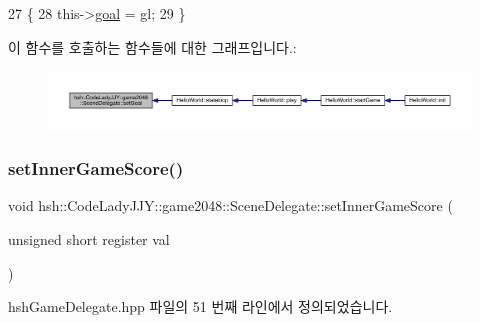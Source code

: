 \begin{DoxyCode}
27                                                         \{
28                     this->\hyperlink{classhsh_1_1_code_lady_j_j_y_1_1game2048_1_1_scene_delegate_a837886106e5ac017e4f57d8f56943e20}{goal} = gl;
29                 \}
\end{DoxyCode}
이 함수를 호출하는 함수들에 대한 그래프입니다.\+:
\nopagebreak
\begin{figure}[H]
\begin{center}
\leavevmode
\includegraphics[width=350pt]{d7/d4d/classhsh_1_1_code_lady_j_j_y_1_1game2048_1_1_scene_delegate_af6805111081144b68d039d8f71d1ed0b_icgraph}
\end{center}
\end{figure}
\mbox{\label{classhsh_1_1_code_lady_j_j_y_1_1game2048_1_1_scene_delegate_abd34ec6afe537cccfd469f2e1fc090fc}} 
\subsubsection{\texorpdfstring{set\+Inner\+Game\+Score()}{setInnerGameScore()}}
{\footnotesize\ttfamily void hsh\+::\+Code\+Lady\+J\+J\+Y\+::game2048\+::\+Scene\+Delegate\+::set\+Inner\+Game\+Score (\begin{DoxyParamCaption}\item[{unsigned short register}]{val }\end{DoxyParamCaption})\hspace{0.3cm}{\ttfamily [inline]}}



hsh\+Game\+Delegate.\+hpp 파일의 51 번째 라인에서 정의되었습니다.


